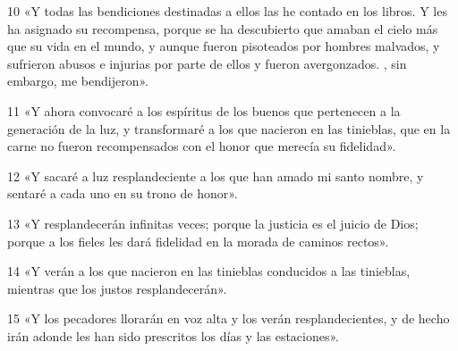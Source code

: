 \par 10 «Y todas las bendiciones destinadas a ellos las he contado en los libros. Y les ha asignado su recompensa, porque se ha descubierto que amaban el cielo más que su vida en el mundo, y aunque fueron pisoteados por hombres malvados, y sufrieron abusos e injurias por parte de ellos y fueron avergonzados. , sin embargo, me bendijeron».
\par 11 «Y ahora convocaré a los espíritus de los buenos que pertenecen a la generación de la luz, y transformaré a los que nacieron en las tinieblas, que en la carne no fueron recompensados ​​con el honor que merecía su fidelidad».
\par 12 «Y sacaré a luz resplandeciente a los que han amado mi santo nombre, y sentaré a cada uno en su trono de honor».
\par 13 «Y resplandecerán infinitas veces; porque la justicia es el juicio de Dios; porque a los fieles les dará fidelidad en la morada de caminos rectos».
\par 14 «Y verán a los que nacieron en las tinieblas conducidos a las tinieblas, mientras que los justos resplandecerán».
\par 15 «Y los pecadores llorarán en voz alta y los verán resplandecientes, y de hecho irán adonde les han sido prescritos los días y las estaciones».

